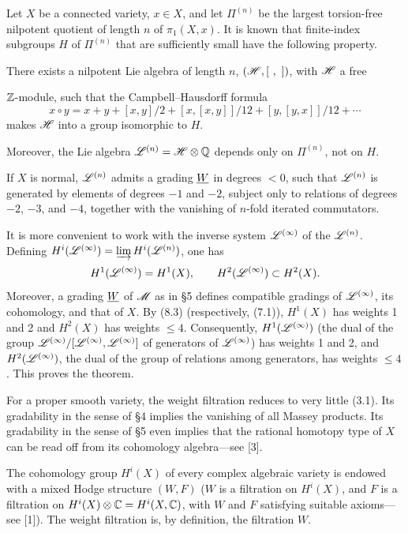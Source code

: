  Let \(X\) be a connected variety, \(x\in X\), and let \(\Pi^{(n)}\) be the largest torsion-free nilpotent quotient of length \(n\) of \(\pi_1(X,x)\). It is known that finite-index subgroups \(H\) of \(\Pi^{(n)}\) that are sufficiently small have the following property.

\NumPara{(*)} There exists a nilpotent Lie algebra of length \(n\), \((\mathscr{H},[\ ,\ ])\), with \(\mathscr{H}\) a free
\EndSourcePage

\ReaderFont
\(\mathbb{Z}\)-module, such that the Campbell--Hausdorff formula
\[
x\circ y=x+y+[x,y]/2+[x,[x,y]]/12+[y,[y,x]]/12+\cdots
\]
makes \(\mathscr{H}\) into a group isomorphic to \(H\).

Moreover, the Lie algebra \(\mathscr{L}^{(n)}=\mathscr{H}\otimes\mathbb{Q}\) depends only on \(\Pi^{(n)}\), not on \(H\).

 If \(X\) is normal, \(\mathscr{L}^{(n)}\) admits a grading \(\underline{W}\) in degrees \(<0\), such that \(\mathscr{L}^{(n)}\) is generated by elements of degrees \(-1\) and \(-2\), subject only to relations of degrees \(-2\), \(-3\), and \(-4\), together with the vanishing of \(n\)-fold iterated commutators.\EndTheorem

It is more convenient to work with the inverse system \(\mathscr{L}^{(\infty)}\) of the \(\mathscr{L}^{(n)}\). Defining \(H^i(\mathscr{L}^{(\infty)})=\varinjlim H^i(\mathscr{L}^{(n)})\), one has
\[
H^1(\mathscr{L}^{(\infty)})=H^1(X),\qquad H^2(\mathscr{L}^{(\infty)})\subset H^2(X).
\]
Moreover, a grading \(\underline{W}\) of \(\mathscr{M}\) as in §5 defines compatible gradings of \(\mathscr{L}^{(\infty)}\), its cohomology, and that of \(X\). By (8.3) (respectively, (7.1)), \(H^1(X)\) has weights 1 and 2 and \(H^2(X)\) has weights \(\le4\). Consequently, \(H^1(\mathscr{L}^{(\infty)})\) (the dual of the group \(\mathscr{L}^{(\infty)}/[\mathscr{L}^{(\infty)},\mathscr{L}^{(\infty)}]\) of generators of \(\mathscr{L}^{(\infty)}\)) has weights 1 and 2, and \(H^2(\mathscr{L}^{(\infty)})\), the dual of the group of relations among generators, has weights \(\le4\). This proves the theorem.

 For a proper smooth variety, the weight filtration reduces to very little (3.1). Its gradability in the sense of §4 implies the vanishing of all Massey products. Its gradability in the sense of §5 even implies that the rational homotopy type of \(X\) can be read off from its cohomology algebra---see [3].

 The cohomology group \(H^i(X)\) of every complex algebraic variety is endowed with a mixed Hodge structure \((W,F)\) (\(W\) is a filtration on \(H^i(X)\), and \(F\) is a filtration on \(H^i(X)\otimes\mathbb{C}=H^i(X,\mathbb{C})\), with \(W\) and \(F\) satisfying suitable axioms---see [1]). The weight filtration is, by definition, the filtration \(W\).


